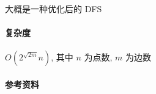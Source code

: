 大概是一种优化后的 DFS

\paragraph{复杂度} \(O\left(2^{\sqrt{2m}}n\right)\), 其中 \(n\) 为点数, \(m\) 为边数

\paragraph{参考资料} \cite{yoichi2012exponential}